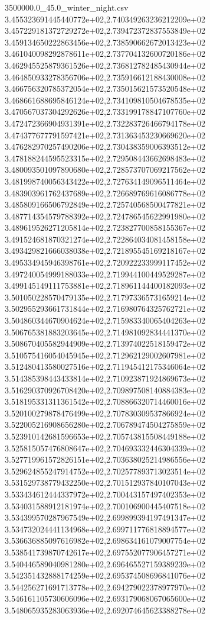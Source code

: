 \begin{filecontents*}{3500000.0_45.0_winter_night.csv}
3.455323691445440772e+02,2.740349263236212209e+02
3.457229181372729272e+02,2.739472372837553849e+02
3.459134650222863456e+02,2.738590662672013423e+02
3.461040098292878611e+02,2.737704132600720186e+02
3.462945525879361526e+02,2.736812782485430944e+02
3.464850933278356706e+02,2.735916612188430008e+02
3.466756320785372054e+02,2.735015621573520548e+02
3.468661688695846124e+02,2.734109810504678535e+02
3.470567037304292626e+02,2.733199178847107760e+02
3.472472366904931391e+02,2.732283726466794178e+02
3.474377677791597421e+02,2.731363453230669620e+02
3.476282970257490206e+02,2.730438359006393512e+02
3.478188244595523315e+02,2.729508443662698483e+02
3.480093501097890680e+02,2.728573707069217562e+02
3.481998740056343422e+02,2.727634149096511464e+02
3.483903961762437689e+02,2.726689769616086778e+02
3.485809166506792849e+02,2.725740568500477821e+02
3.487714354579788392e+02,2.724786545622991980e+02
3.489619526271205814e+02,2.723827700858155367e+02
3.491524681870321274e+02,2.722864034081458158e+02
3.493429821666038038e+02,2.721895545169218167e+02
3.495334945946398761e+02,2.720922233999117452e+02
3.497240054999188033e+02,2.719944100449529287e+02
3.499145149111753881e+02,2.718961144400182093e+02
3.501050228570479135e+02,2.717973365731659214e+02
3.502955293661731844e+02,2.716980764325762721e+02
3.504860344670904624e+02,2.715983340065404263e+02
3.506765381883203645e+02,2.714981092834441370e+02
3.508670405582944909e+02,2.713974022518159472e+02
3.510575416054045945e+02,2.712962129002607981e+02
3.512480413580027516e+02,2.711945412175346064e+02
3.514385398443433814e+02,2.710923871924869673e+02
3.516290370926708420e+02,2.709897508140884383e+02
3.518195331311361542e+02,2.708866320714460016e+02
3.520100279878476499e+02,2.707830309537866924e+02
3.522005216908656280e+02,2.706789474504275859e+02
3.523910142681596653e+02,2.705743815508449188e+02
3.525815057476808647e+02,2.704693332446304339e+02
3.527719961572826151e+02,2.703638025214986556e+02
3.529624855247914752e+02,2.702577893713023514e+02
3.531529738779432250e+02,2.701512937840107043e+02
3.533434612444337972e+02,2.700443157497402353e+02
3.534031588912181974e+02,2.700106900445407518e+02
3.534399570287967549e+02,2.699899394197491347e+02
3.534732024441134968e+02,2.699711776818894577e+02
3.536636885097616982e+02,2.698634161079007754e+02
3.538541739870742617e+02,2.697552077906457271e+02
3.540446589040981280e+02,2.696465527159389239e+02
3.542351432888174259e+02,2.695374508696841076e+02
3.544256271691713778e+02,2.694279022378977970e+02
3.546161105730606096e+02,2.693179068067065600e+02
3.548065935283063936e+02,2.692074645623388278e+02

\end{filecontents*}
